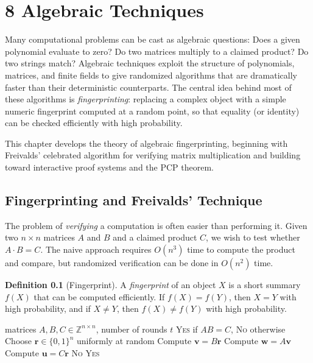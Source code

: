 \documentclass[twoside,12pt]{book}
\theoremstyle{plain}
\theoremstyle{definition}
\newtheorem{definition}[theorem]{Definition}
\theoremstyle{remark}
\begin{document}
\chapter*{8 Algebraic Techniques}
\label{ch:algebraic}

Many computational problems can be cast as algebraic questions: Does a given polynomial evaluate to zero? Do two matrices multiply to a claimed product? Do two strings match? Algebraic techniques exploit the structure of polynomials, matrices, and finite fields to give randomized algorithms that are dramatically faster than their deterministic counterparts. The central idea behind most of these algorithms is \emph{fingerprinting}: replacing a complex object with a simple numeric fingerprint computed at a random point, so that equality (or identity) can be checked efficiently with high probability.

This chapter develops the theory of algebraic fingerprinting, beginning with Freivalds' celebrated algorithm for verifying matrix multiplication and building toward interactive proof systems and the PCP theorem.

\section{Fingerprinting and Freivalds' Technique}
\label{sec:freivalds}

The problem of \emph{verifying} a computation is often easier than performing it. Given two $n \times n$ matrices $A$ and $B$ and a claimed product $C$, we wish to test whether $A \cdot B = C$. The naive approach requires $O(n^3)$ time to compute the product and compare, but randomized verification can be done in $O(n^2)$ time.

\begin{definition}[Fingerprint]
A \emph{fingerprint} of an object $X$ is a short summary $f(X)$ that can be computed efficiently. If $f(X) = f(Y)$, then $X = Y$ with high probability, and if $X \neq Y$, then $f(X) \neq f(Y)$ with high probability.
\end{definition}

\begin{algorithm}[H]
\caption{Freivalds' Algorithm}
\label{alg:freivalds}
\begin{algorithmic}[1]
\Require matrices $A, B, C \in \mathbb{Z}^{n \times n}$, number of rounds $t$
\Ensure \textsc{Yes} if $AB = C$, \textsc{No} otherwise
  \State Choose $\mathbf{r} \in \{0, 1\}^n$ uniformly at random
  \State Compute $\mathbf{v} = B\mathbf{r}$ 
  \State Compute $\mathbf{w} = A\mathbf{v}$ 
  \State Compute $\mathbf{u} = C\mathbf{r}$ 
    \State \Return \textsc{No}
  \EndIf
\EndFor
\State \Return \textsc{Yes}
\end{algorithmic}
\end{algorithm}
\end{document}

